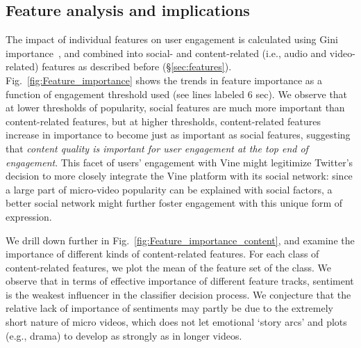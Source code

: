 \subsection{Feature analysis and implications}
The impact of individual features on user engagement is calculated using Gini importance~\cite{louppe2013understanding}, and combined into social-  and content-related (i.e., audio and video-related) features as described before (\S\ref{sec:features}). Fig.~\ref{fig:Feature_importance} shows the trends in  feature importance as a function of engagement threshold used (see lines labeled 6 sec). We observe that at lower thresholds of popularity, social features are much more important than content-related features, but at higher thresholds, content-related features increase in importance to become just as important as social features, suggesting that \emph{content quality is important for user engagement at the top end of engagement}. This facet of users' engagement with Vine might legitimize Twitter's decision to more closely integrate the Vine platform with its social network: since a large part of micro-video popularity can be explained with social factors, a better social network might further foster engagement with this unique form of expression. %

We drill down further in Fig.~\ref{fig:Feature_importance_content}, and examine the importance of different kinds of content-related features. For each class of content-related features, we plot the mean of the feature set of the class. We observe that in terms of effective importance of different feature tracks, sentiment is the weakest influencer in the classifier decision process. We conjecture that the relative lack of importance of sentiments may partly be due to the extremely short nature of micro videos, which does not let emotional `story arcs' and plots (e.g., drama) to develop as strongly as in longer videos.



